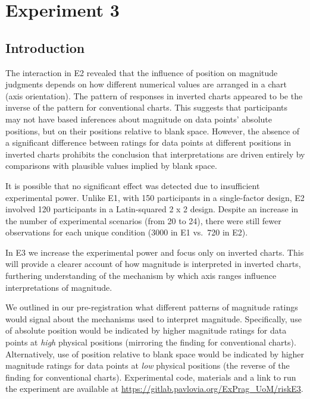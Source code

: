 \documentclass[journal]{vgtc}                %
\begin{document}
\hypertarget{experiment-3}{%
\section{Experiment 3}\label{experiment-3}}

\hypertarget{introduction-2}{%
\subsection{Introduction}\label{introduction-2}}

The interaction in E2 revealed that the influence of position on
magnitude judgments depends on how different numerical values are
arranged in a chart (axis orientation). The pattern of responses in
inverted charts appeared to be the inverse of the pattern for
conventional charts. This suggests that participants may not have based
inferences about magnitude on data points' absolute positions, but on
their positions relative to blank space. However, the absence of a
significant difference between ratings for data points at different
positions in inverted charts prohibits the conclusion that
interpretations are driven entirely by comparisons with plausible values
implied by blank space.

It is possible that no significant effect was detected due to
insufficient experimental power. Unlike E1, with 150 participants in a
single-factor design, E2 involved 120 participants in a Latin-squared 2
x 2 design. Despite an increase in the number of experimental scenarios
(from 20 to 24), there were still fewer observations for each unique
condition (3000 in E1 vs.~720 in E2).

In E3 we increase the experimental power and focus only on inverted
charts. This will provide a clearer account of how magnitude is
interpreted in inverted charts, furthering understanding of the
mechanism by which axis ranges influence interpretations of magnitude.

We outlined in our pre-registration what
different patterns of magnitude ratings would signal about the
mechanisms used to interpret magnitude. Specifically, use of absolute
position would be indicated by higher magnitude ratings for data points
at \emph{high} physical positions (mirroring the finding for conventional
charts). Alternatively, use of position relative to blank space would be
indicated by higher magnitude ratings for data points at \emph{low} physical
positions (the reverse of the finding for conventional charts). Experimental code, materials and a link to run the experiment are available at \url{https://gitlab.pavlovia.org/ExPrag_UoM/riskE3}.
\end{document}
